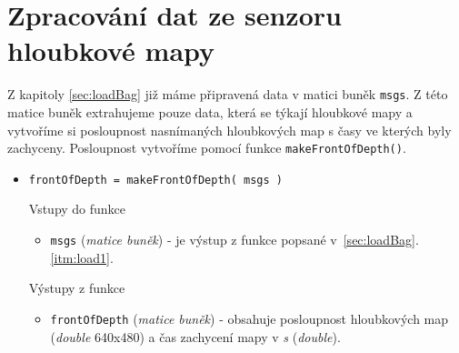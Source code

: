 \documentclass[10pt,a4paper,titlepage,oneside]{report}
\begin{document}
\section{Zpracování dat ze senzoru hloubkové mapy}
\label{sec:procDepth}
Z kapitoly \ref{sec:loadBag} již máme připravená data v matici buněk \verb|msgs|. Z této matice buněk extrahujeme pouze data, která se týkají hloubkové mapy a vytvoříme si posloupnost nasnímaných hloubkových map s časy ve kterých byly zachyceny. Posloupnost vytvoříme pomocí funkce \verb|makeFrontOfDepth()|.
\begin{itemize}
  	\item \verb|frontOfDepth = makeFrontOfDepth( msgs )|

    		Vstupy do funkce
        		\begin{itemize}
  			\item \verb|msgs| (\textit{matice buněk}) - je výstup z funkce popsané v~\ref{sec:loadBag}.\ref{itm:load1}.
    			\end{itemize}
    		Výstupy z funkce
        		\begin{itemize}
  			\item \verb|frontOfDepth| (\textit{matice buněk}) - obsahuje posloupnost hloubkových map (\textit{double} 640x480) a čas zachycení mapy v \textit{s} (\textit{double}). 
    			\end{itemize}
    \end{itemize}





\end{document}
